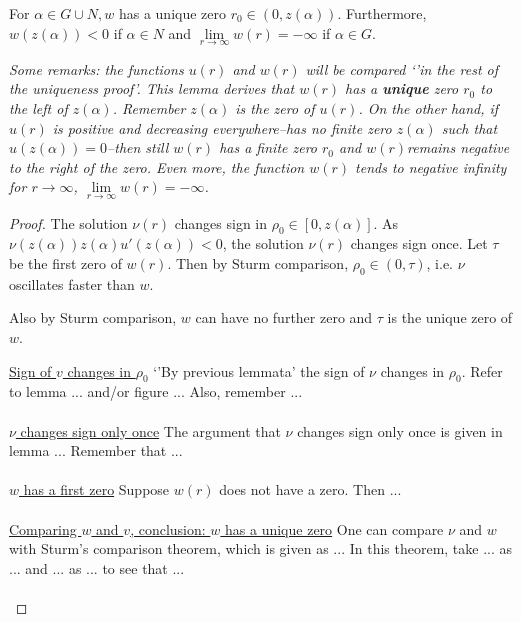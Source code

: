 
\begin{lemma}\label{wq}
  For $\alpha\in G\cup N,w$ has a unique zero $r_0\in(0,z(\alpha)).$
  Furthermore, $w(z(\alpha))<0$ if $\alpha\in N$
  and $\underset{r\to\infty}{\lim}w(r)=-\infty$ if $\alpha\in G$.

  \seperate

  \emph{Some remarks: the functions $u(r)$ and $w(r)$ will be compared `'in the rest of the uniqueness proof'. This lemma derives that $w(r)$ has a \textbf{unique} zero $r_0$ to the left of $z(\alpha)$. Remember $z(\alpha)$ is the zero of $u(r)$. On the other hand, if $u(r)$ is positive and decreasing everywhere--has no finite zero $z(\alpha)$ such that $u(z(\alpha))=0$--then still $w(r)$ has a finite zero $r_0$ and $w(r)$remains negative to the right of the zero. Even more, the function $w(r)$ tends to negative infinity for $r\to\infty$, $\underset{r\to\infty}{\lim}w(r)=-\infty$.}

\begin{proof}
The solution $\nu(r)$ changes sign in $\rho_0\in[0,z(\alpha)]$.
As $\nu(z(\alpha))z(\alpha)u'(z(\alpha))<0$, the solution $\nu(r)$ changes sign once.
Let $\tau$ be the first zero of $w(r)$.
Then by Sturm comparison, $\rho_0\in(0,\tau)$, i.e. $\nu$ oscillates faster than $w$.

Also by Sturm comparison, $w$ can have no further zero and $\tau$ is the unique zero of $w$.

\seperate

\underline{Sign of $v$ changes in $\rho_0$}
`'By previous lemmata' the sign of $\nu$ changes in $\rho_0$.
Refer to lemma ... and/or figure ...
Also, remember ...\\ \\

\underline{$\nu$ changes sign only once}
The argument that $\nu$ changes sign only once is given in lemma ...
Remember that ...\\ \\

\underline{$w$ has a first zero}
Suppose $w(r)$ does not have a zero.
Then ...\\ \\

\underline{Comparing $w$ and $v$, conclusion: $w$ has a unique zero}
One can compare $\nu$ and $w$ with Sturm's comparison theorem,
which is given as ...
In this theorem, take ... as ... and ... as ... to see that ...\\ \\


\end{proof}
\end{lemma}
